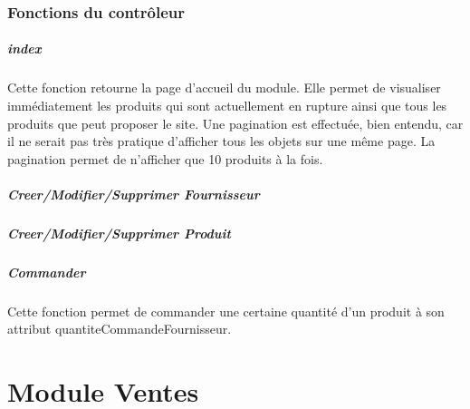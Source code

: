 \documentclass[twoside,UTF8]{EPURapport}
\begin{document}
    \subsection{Fonctions du contrôleur}
\paragraph{index} Cette fonction retourne la page d'accueil du module. Elle permet de visualiser immédiatement les produits qui sont actuellement en rupture ainsi que tous les produits que peut proposer le site. Une pagination est effectuée, bien entendu, car il ne serait pas très pratique d'afficher tous les objets sur une même page. La pagination permet de n'afficher que 10 produits à la fois.

\paragraph{Creer/Modifier/Supprimer Fournisseur}

\paragraph{Creer/Modifier/Supprimer Produit}

\paragraph{Commander} Cette fonction permet de commander une certaine quantité d'un produit à son attribut quantiteCommandeFournisseur. 

\chapter{Module Ventes}%
\end{document}
